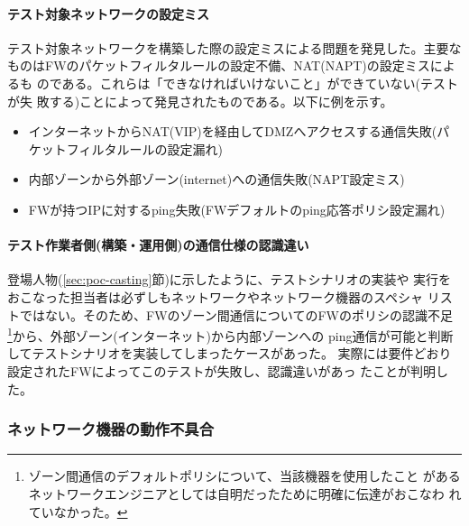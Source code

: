     \paragraph{テスト対象ネットワークの設定ミス}
テスト対象ネットワークを構築した際の設定ミスによる問題を発見した。主要な
ものはFWのパケットフィルタルールの設定不備、NAT(NAPT)の設定ミスによるも
のである。これらは「できなければいけないこと」ができていない(テストが失
敗する)ことによって発見されたものである。以下に例を示す。
\begin{itemize}
 \item インターネットからNAT(VIP)を経由してDMZへアクセスする通信失敗(パ
       ケットフィルタルールの設定漏れ)
 \item \yo 内部ゾーンから外部ゾーン(internet)への通信失敗(NAPT設定ミス)
 \item FWが持つIPに対するping失敗(FWデフォルトのping応答ポリシ設定漏れ)
\end{itemize}

    \paragraph{テスト作業者側(構築・運用側)の通信仕様の認識違い}
登場人物(\ref{sec:poc-casting}節)に示したように、テストシナリオの実装や
実行をおこなった担当者は必ずしもネットワークやネットワーク機器のスペシャ
リストではない。そのため、FWのゾーン間通信についてのFWのポリシの認識不足
\footnote{ゾーン間通信のデフォルトポリシについて、当該機器を使用したこと
があるネットワークエンジニアとしては自明だったために明確に伝達がおこなわ
れていなかった。}から、\yo 外部ゾーン(インターネット)から内部ゾーンへの
ping通信が可能と判断してテストシナリオを実装してしまったケースがあった。
実際には要件どおり設定されたFWによってこのテストが失敗し、認識違いがあっ
たことが判明した。

   \subsubsection{ネットワーク機器の動作不具合}
   \label{sec:find-nw-device-bug}

